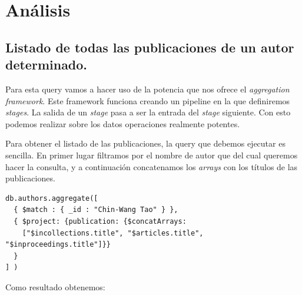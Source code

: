 \section{Análisis}

\subsection{Listado de todas las publicaciones de un autor determinado.}

Para esta query vamos a hacer uso de la potencia que nos ofrece el \textit{aggregation framework}. Este framework funciona creando un pipeline en la que definiremos \textit{stages}. La salida de un \textit{stage} pasa a ser la entrada del \textit{stage} siguiente. Con esto podemos realizar sobre los datos operaciones realmente potentes.

Para obtener el listado de las publicaciones, la query que debemos ejecutar es sencilla. En primer lugar filtramos por el nombre de autor que del cual queremos hacer la consulta, y a continuación concatenamos los \textit{arrays} con los títulos de las publicaciones.

\begin{verbatim}
db.authors.aggregate([
  { $match : { _id : "Chin-Wang Tao" } }, 
  { $project: {publication: {$concatArrays: 
    ["$incollections.title", "$articles.title", "$inproceedings.title"]}}
  }
] )
\end{verbatim}


Como resultado obtenemos:

